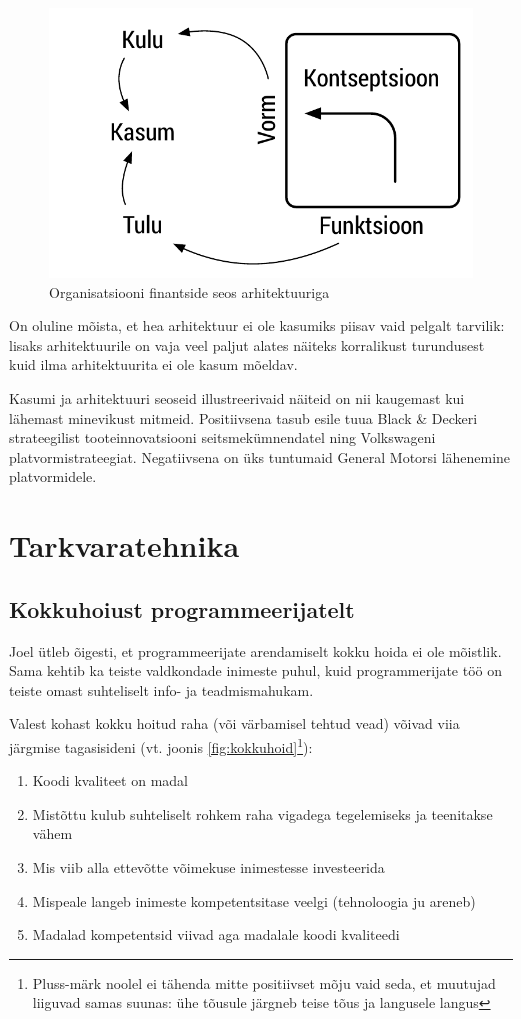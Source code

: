 \documentclass{article}
\begin{document}
\begin{figure}[htp]
	\begin{center}
		\includegraphics[width=.6\textwidth]{ffc_profit.pdf}
		\caption{Organisatsiooni finantside seos arhitektuuriga}
		\label{fig:arh}
	\end{center}
\end{figure}


On oluline mõista, et hea arhitektuur ei ole kasumiks piisav vaid pelgalt tarvilik: lisaks arhitektuurile on vaja veel paljut alates näiteks korralikust turundusest kuid ilma arhitektuurita ei ole kasum mõeldav. 

Kasumi ja arhitektuuri seoseid illustreerivaid näiteid on nii kaugemast kui lähemast minevikust mitmeid. Positiivsena tasub esile tuua Black \& Deckeri strateegilist tooteinnovatsiooni seitsmekümnendatel ning Volkswageni platvormistrateegiat. Negatiivsena on üks tuntumaid General Motorsi lähenemine platvormidele. 


\section{Tarkvaratehnika}
\subsection{Kokkuhoiust programmeerijatelt}
\label{sec:kokkuhoid}
Joel ütleb õigesti, et programmeerijate arendamiselt kokku hoida ei ole mõistlik. Sama kehtib ka teiste valdkondade inimeste puhul, kuid programmerijate töö on teiste omast suhteliselt info- ja teadmismahukam.

Valest kohast kokku hoitud raha (või värbamisel tehtud vead) võivad viia järgmise tagasisideni (vt. joonis \ref{fig:kokkuhoid}\footnote{Pluss-märk noolel ei tähenda mitte positiivset mõju vaid seda, et muutujad liiguvad samas suunas: ühe tõusule järgneb teise tõus ja langusele langus}):
\begin{enumerate}
	\item Koodi kvaliteet on madal
	\item Mistõttu kulub suhteliselt rohkem raha vigadega tegelemiseks ja teenitakse vähem
	\item Mis viib alla ettevõtte võimekuse inimestesse investeerida
	\item Mispeale langeb inimeste kompetentsitase veelgi (tehnoloogia ju areneb)
	\item Madalad kompetentsid viivad aga madalale koodi kvaliteedi
\end{enumerate}
\end{document}
